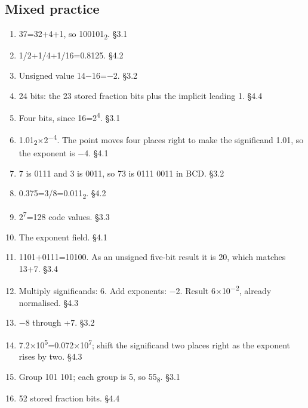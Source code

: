 \documentclass[11pt]{article}
\begin{document}
\begin{keepsection}\subsection{Mixed practice}

\begin{enumerate}
\item 37=32+4+1, so 100101\textsubscript{2}. \hfill{\small\color{FAUblue}§3.1}
\item 1/2+1/4+1/16=0.8125. \hfill{\small\color{FAUblue}§4.2}
\item Unsigned value 14\ensuremath{-}16=\ensuremath{-}2. \hfill{\small\color{FAUblue}§3.2}
\item 24 bits: the 23 stored fraction bits plus the implicit leading 1. \hfill{\small\color{FAUblue}§4.4}
\item Four bits, since 16=2\textsuperscript{4}. \hfill{\small\color{FAUblue}§3.1}
\item 1.01\textsubscript{2}\ensuremath{\times}2\textsuperscript{\ensuremath{-}4}. The point moves four places right to make the significand 1.01, so the exponent is \ensuremath{-}4. \hfill{\small\color{FAUblue}§4.1}
\item 7 is 0111 and 3 is 0011, so 73 is 0111 0011 in BCD. \hfill{\small\color{FAUblue}§3.2}
\item 0.375=3/8=0.011\textsubscript{2}. \hfill{\small\color{FAUblue}§4.2}
\item 2\textsuperscript{7}=128 code values. \hfill{\small\color{FAUblue}§3.3}
\item The exponent field. \hfill{\small\color{FAUblue}§4.1}
\item 1101+0111=10100. As an unsigned five-bit result it is 20, which matches 13+7. \hfill{\small\color{FAUblue}§3.4}
\item Multiply significands: 6. Add exponents: \ensuremath{-}2. Result 6\ensuremath{\times}10\textsuperscript{\ensuremath{-}2}, already normalised. \hfill{\small\color{FAUblue}§4.3}
\item \ensuremath{-}8 through +7. \hfill{\small\color{FAUblue}§3.2}
\item 7.2\ensuremath{\times}10\textsuperscript{5}=0.072\ensuremath{\times}10\textsuperscript{7}; shift the significand two places right as the exponent rises by two. \hfill{\small\color{FAUblue}§4.3}
\item Group 101 101; each group is 5, so 55\textsubscript{8}. \hfill{\small\color{FAUblue}§3.1}
\item 52 stored fraction bits. \hfill{\small\color{FAUblue}§4.4}

\end{enumerate}
\end{keepsection}
\end{document}
